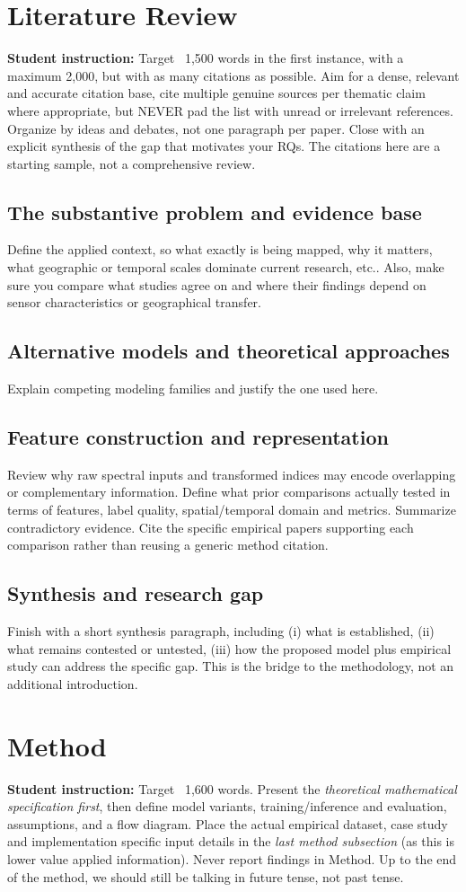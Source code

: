 \documentclass[11pt,letterpaper]{article}
\newcommand{\guide}[1]{\par\begingroup\color{blue!60!black}\small\textbf{Student
instruction:} #1\par\endgroup}
\begin{document}
\section{Literature Review}
\guide{Target ~1,500 words in the first instance, with a maximum 2,000, but with as many citations as possible. 
Aim for a dense, relevant and accurate citation
base, cite multiple genuine sources per thematic claim where appropriate, but NEVER pad
the list with unread or irrelevant references. Organize by ideas and debates, not one
paragraph per paper. Close with an explicit synthesis of the gap that motivates your RQs.
The citations here are a starting sample, not a comprehensive review.}
\subsection{The substantive problem and evidence base}
Define the applied context, so what exactly is being mapped, why it matters, what geographic or
temporal scales dominate current research, etc.. Also, make sure you compare what studies agree on and where their
findings depend on sensor characteristics or geographical transfer. 
\subsection{Alternative models and theoretical approaches}
Explain competing modeling families and justify the one used here. 
\subsection{Feature construction and representation}
Review why raw spectral inputs and transformed indices may encode overlapping or
complementary information. Define what prior comparisons actually tested in terms of features, label
quality, spatial/temporal domain and metrics. Summarize contradictory evidence. Cite the specific 
empirical papers supporting each
comparison rather than reusing a generic method citation.
\subsection{Synthesis and research gap}
Finish with a short synthesis paragraph, including (i) what is established, (ii) what remains contested or
untested, (iii) how the proposed model plus empirical study can address the specific gap.
This is the bridge to the methodology, not an additional introduction.

\section{Method}
\guide{Target ~1,600 words. Present the \emph{theoretical mathematical specification
first}, then define model variants, training/inference and evaluation, assumptions, and a
flow diagram. Place the actual empirical dataset, case study and implementation specific
input details in the \emph{last method subsection} (as this is lower value applied information). 
Never report findings in Method. Up to the end of the method, we should still be talking in future tense, not past tense.}
\end{document}

